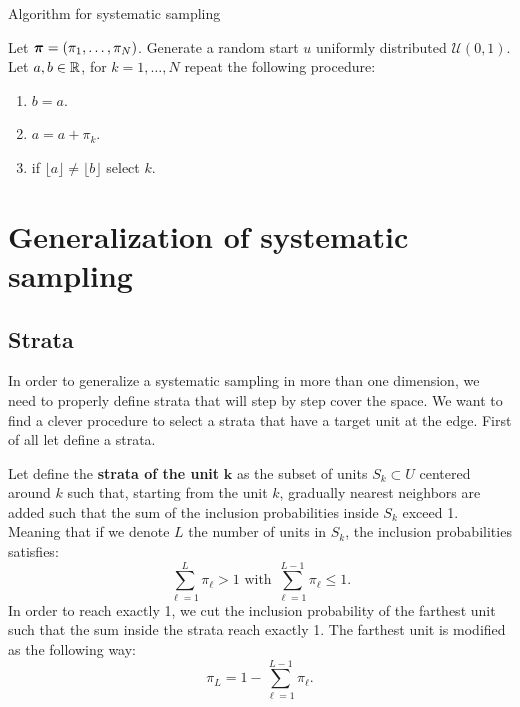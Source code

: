 \documentclass[12pt,english]{article}\usepackage[]{graphicx}\usepackage{xcolor}
\begin{document}
\begin{algorithm}[htb!]
\caption{Algorithm for systematic sampling}\label{algo:sys1d}
Let $\boldsymbol{\pi} = (\pi_1,\dots,\pi_N)$. Generate a random start $u$ uniformly distributed $\mathcal{U}(0,1)$. Let $a,b\in\mathbb{R}$, for $k = 1,\dots,N$ repeat the following procedure:
\begin{enumerate}
\item $b = a$.
\item $a = a + \pi_k$.
\item if $\lfloor a \rfloor \neq \lfloor b \rfloor$ select $k$.
\end{enumerate}
\end{algorithm}





\section{Generalization of systematic sampling}



\subsection{Strata}
In order to generalize a systematic sampling in more than one dimension, we need to properly define strata that will step by step cover the space. We want to find a clever procedure to select a strata that have a target unit at the edge. First of all let define a strata.

\begin{defn}
Let define the \textbf{strata of the unit } $\boldsymbol k$ as the subset of units $S_k\subset U$ centered around $k$ such that, starting from the unit $k$, gradually nearest neighbors are added such that the sum of the inclusion probabilities inside $S_k$ exceed 1. Meaning that if we denote $L$ the number of units in $S_k$, the inclusion probabilities satisfies:
$$\sum_{\ell = 1}^L\pi_\ell > 1 \text{ with } \sum_{\ell = 1}^{L-1} \pi_\ell  \leq 1. $$
In order to reach exactly 1, we cut the inclusion probability of the farthest unit such that the sum inside the strata reach exactly 1. The farthest unit is modified as the following way:
$$ \pi_L = 1- \sum_{\ell = 1}^{L-1} \pi_\ell. $$
\end{defn}
\end{document}
